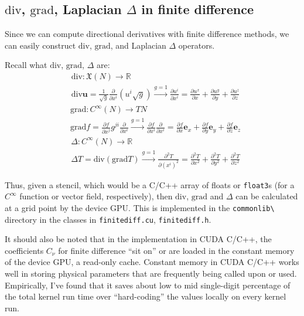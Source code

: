 \documentclass[10pt, landscape]{amsart}
\begin{document}
\subsection{ $\text{div}$, $\text{grad}$, Laplacian $\Delta$ in finite difference }

Since we can compute directional derivatives with finite difference methods, we can easily construct $\text{div}$, $\text{grad}$, and Laplacian $\Delta $ operators.

Recall what $\text{div}$, $\text{grad}$, $\Delta$ are:
\[
\begin{aligned}
  & \text{div} : \mathfrak{X}(N) \to \mathbb{R} \\ 
  & \text{div}\mathbf{u} = \frac{1}{\sqrt{g}} \frac{ \partial }{ \partial x^i} (u^i \sqrt{g}) \xrightarrow{ g = 1} \frac{ \partial u^i}{ \partial x^i} = \frac{ \partial u^x}{ \partial x} +  \frac{ \partial u^y}{ \partial y} +  \frac{ \partial u^z}{ \partial z}
  \end{aligned}
\]
\[
\begin{aligned}
  & \text{grad}: C^{\infty}(N) \to TN \\ 
  & \text{grad}f = \frac{ \partial f}{ \partial x^j} g^{ji} \frac{ \partial }{ \partial x^i} \xrightarrow{g=1} \frac{ \partial f}{ \partial x^i} \frac{ \partial }{ \partial x^i} = \frac{ \partial f}{ \partial x} \mathbf{e}_x + \frac{ \partial f}{ \partial y} \mathbf{e}_y + \frac{ \partial f}{ \partial z} \mathbf{e}_z
  \end{aligned}
\]
\[
\begin{aligned}
  & \Delta : C^{\infty}(N) \to \mathbb{R} \\ 
  & \Delta T = \text{div}(\text{grad} T) \xrightarrow{ g= 1} \frac{ \partial^2 T}{ \partial (x^i)^2 } = \frac{ \partial^2 T}{ \partial x^2 } + \frac{ \partial^2 T}{ \partial y^2 } + \frac{ \partial^2 T}{ \partial z^2 } 
  \end{aligned}
\]

Thus, given a stencil, which would be a C/C++ array of floats or \verb|float3|s (for a $C^{\infty}$ function or vector field, respectively), then $\text{div}$, $\text{grad}$ and $\Delta $ can be calculated at a grid point by the device GPU.  This is implemented in the \verb|commonlib\| directory in the classes in \verb|finitediff.cu|, \verb|finitediff.h|.

It should also be noted that in the implementation in CUDA C/C++, the coefficients $C_{\nu}$ for finite difference ``sit on'' or are loaded in the constant memory of the device GPU, a read-only cache.  Constant memory in CUDA C/C++ works well in storing physical parameters that are frequently being called upon or used.  Empirically, I've found that it saves about low to mid single-digit percentage of the total kernel run time over ``hard-coding'' the values locally on every kernel run.  
\end{document}
